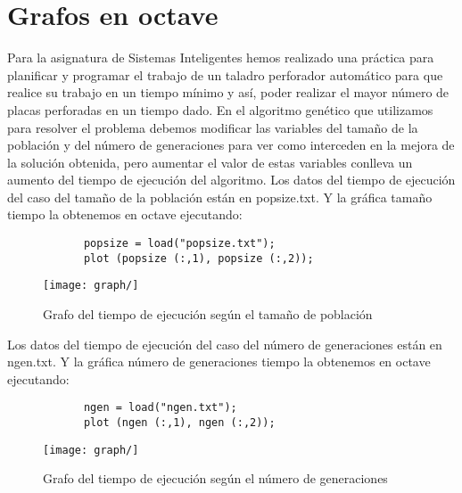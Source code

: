 \documentclass[a4,12pt,graphicx,caption,rotating]{article}
\begin{document}
\section{Grafos en octave}
Para la asignatura de Sistemas Inteligentes hemos realizado una práctica para planificar y programar el trabajo de un taladro perforador automático para que realice su trabajo en un tiempo mínimo y así, poder realizar el mayor número de placas perforadas en un tiempo dado.
En el algoritmo genético que utilizamos para resolver el problema debemos modificar las variables del tamaño de la población y del número de generaciones para ver como interceden en la mejora de la solución obtenida, pero aumentar el valor de estas variables conlleva un aumento del tiempo de ejecución del algoritmo.
Los datos del tiempo de ejecución del caso del tamaño de la población están en popsize.txt.
Y la gráfica tamaño tiempo la obtenemos en octave ejecutando:
\begin{verbatim}
            popsize = load("popsize.txt");
            plot (popsize (:,1), popsize (:,2));
\end{verbatim}
\begin{figure}[t]
\begin{center}
\texttt{[image: graph/]}
\end{center}
\caption{Grafo del tiempo de ejecución según el tamaño de población}
\label{fig:popsize}
\end{figure}
Los datos del tiempo de ejecución del caso del número de generaciones están en ngen.txt.
Y la gráfica número de generaciones tiempo la obtenemos en octave ejecutando:
\begin{verbatim}
            ngen = load("ngen.txt");
            plot (ngen (:,1), ngen (:,2));
\end{verbatim}
\begin{figure}[t]
\begin{center}
\texttt{[image: graph/]}
\end{center}
\caption{Grafo del tiempo de ejecución según el número de generaciones}
\label{fig:ngen}
\end{figure}
\end{document}

